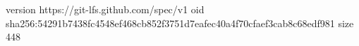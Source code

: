 version https://git-lfs.github.com/spec/v1
oid sha256:54291b7438fc4548ef468cb852f3751d7eafec40a4f70cfaef3cab8c68edf981
size 448
